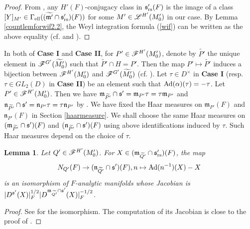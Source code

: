 \documentclass[a4paper]{amsart}
\newcommand{\fm}{{\mathfrak{m}}} \newcommand{\fn}{{\mathfrak{n}}}\newcommand{\fo}{{\mathfrak{o}}} \newcommand{\fp}{{\mathfrak{p}}}
\newcommand{\wt}{\widetilde}                        \newcommand{\wh}{\widehat}                      \newcommand{\wpair}[1]{\left\{{#1}\right\}}
\newtheorem{lem}[thm]{Lemma}
\theoremstyle{definition}
\theoremstyle{remark}
\numberwithin{equation}{subsection}
\begin{document}
\begin{proof}
From \cite[Lemma 9.1]{MR4350885}, any $H'(F)$-conjugacy class in ${\mathfrak{s}}'_{\mathrm{rs}}(F)$ is the image of a class $[Y]_{M'}\in\Gamma_\el((\wt{\fm'}\cap\fs'_\rs)(F))$ for some $M'\in\mathscr{L}^{H'}(M'_0)$ in our case. By Lemma \ref{countlemforwif2.2}, the Weyl integration formula (\ref{wif}) can be written as the above equality (cf. \cite[p. 16-17]{MR1114210} and \cite[(3) in \S I.3]{MR1344131}). 
\end{proof}

In both of \textbf{Case I} and \textbf{Case II}, for $P'\in\mathscr{F}^{H'}(M'_0)$, denote by $\wt{P'}$ the unique element in $\msf^{G'}(\wt{M'_0})$ such that $\wt{P'}\cap H=P'$. Then the map $P'\mapsto\wt{P'}$ induces a bijection between $\mathscr{F}^{H'}(M'_0)$ and $\msf^{G'}(\wt{M'_0})$ (cf. \cite[\S3.4]{MR4350885}). 
Let $\tau\in D^\times$ in \textbf{Case I} (resp. $\tau\in GL_2(D)$ in \textbf{Case II}) be an element such that ${\mathrm{Ad}}(\alpha)(\tau)=-\tau$. Let $P'\in\mathscr{F}^{H'}(M'_0)$. Then we have $\fm_{\wt{P'}}\cap\fs'=\fm_{P'}\tau=\tau\fm_{P'}$ and $\fn_{\wt{P'}}\cap\fs'=\fn_{P'}\tau=\tau\fn_{P'}$ by \cite[Proposition 3.12]{MR4350885}. We have fixed the Haar measures on $\fm_{P'}(F)$ and $\fn_{P'}(F)$ in Section \ref{haarmeasure}. We shall choose the same Haar measures on $(\fm_{\wt{P'}}\cap\fs')(F)$ and $(\fn_{\wt{P'}}\cap\fs')(F)$ using above identifications induced by $\tau$. Such Haar measures depend on the choice of $\tau$. 

\begin{lem}\label{jac2}
Let $Q'\in\mathscr{F}^{H'}(M'_0)$. For $X\in(\fm_{\wt{Q'}}\cap\fs'_\rs)(F)$, the map
$$ N_{Q'}(F)\ra(\fn_{\wt{Q'}}\cap\fs')(F), n\mapsto \Ad(n^{-1})(X)-X $$
is an isomorphism of $F$-analytic manifolds whose Jacobian is $|D^{\fs'}(X)|_F^{1/2}|D^{\fm_{\wt{Q'}}\cap\fs'}(X)|_F^{-1/2}$. 
\end{lem}

\begin{proof}
See \cite[Lemma 8.1]{MR4350885} for the isomorphism. The computation of its Jacobian is close to the proof of \cite[Proposition 6.3.(ii)]{MR3414387}. 
\end{proof}
\end{document}
